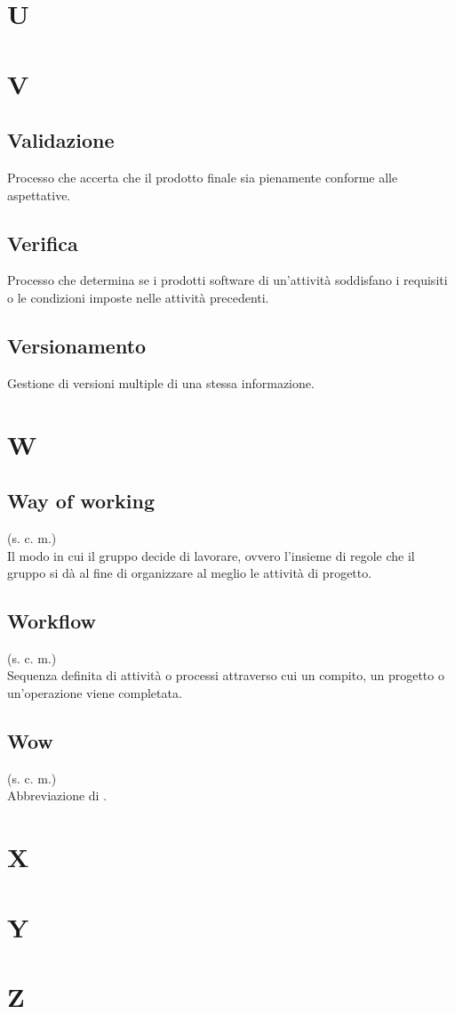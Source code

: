 \section{U}
\pagebreak
\section{V}
    \subsection{Validazione}
    Processo che accerta che il prodotto finale sia pienamente conforme alle aspettative.
    \subsection{Verifica}
    Processo che determina se i prodotti software di un'attività soddisfano
    i requisiti o le condizioni imposte nelle attività precedenti.
    \subsection{Versionamento}
    Gestione di versioni multiple di una stessa informazione.
\pagebreak
\section{W}
    \subsection{Way of working}
    \label{Way of working}
    (s. c. m.)\\
    Il modo in cui il gruppo decide di lavorare, ovvero l'insieme di regole 
    che il gruppo si dà al fine di organizzare al meglio le attività di progetto.
    \subsection{Workflow}
    (s. c. m.)\\
    Sequenza definita di attività o processi attraverso cui un compito, un progetto 
    o un'operazione viene completata.
    \subsection{Wow}
    (s. c. m.)\\
    Abbreviazione di .
\pagebreak
\section{X}
\pagebreak
\section{Y}
\pagebreak
\section{Z}
